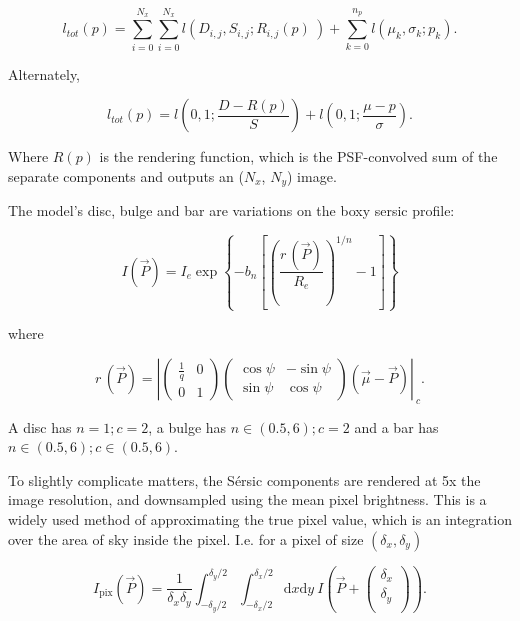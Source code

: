 \documentclass[../main.tex]{subfiles}
\begin{document}
\begin{equation}
l_{tot}(p) = \sum_{i=0}^{N_x}\sum_{i=0}^{N_x}l(D_{i,j}, S_{i,j}; R_{i,j}(p)\ ) + \sum_{k=0}^{n_p}l(\mu_k, \sigma_{k}; p_k).
\end{equation}

Alternately,

\begin{equation}
l_{tot}(p) = l\left(0, 1; \frac{D-R(p)}{S}\right) + l(0, 1; \frac{\mu - p}{\sigma}).
\end{equation}

Where $R(p)$ is the rendering function, which is the PSF-convolved sum of the separate components and outputs an ($N_x$, $N_y$) image.

The model's disc, bulge and bar are variations on the boxy sersic profile:

\begin{equation}
I(\vec{P}) = I_e \exp\left\{-b_n\left[\left(\frac{r\,(\vec{P})}{R_e}\right)^{1/n} - 1\right]\right\}
\end{equation}

where

\begin{equation}
r\,(\vec{P}) = \left|\begin{pmatrix}
\frac{1}{q} & 0 \\
0 & 1
\end{pmatrix}\begin{pmatrix}
\cos\psi & -\sin\psi\\
\sin\psi & \cos\psi
\end{pmatrix}\left(\vec\mu - \vec{P}\right)\right|_{\ c}.
\end{equation}

A disc has $n=1; c=2$, a bulge has $n\in(0.5, 6); c=2$ and a bar has $n\in(0.5, 6); c\in(0.5, 6)$.

To slightly complicate matters, the Sérsic components are rendered at 5x the image resolution, and downsampled using the mean pixel brightness. This is a widely used method of approximating the true pixel value, which is an integration over the area of sky inside the pixel. I.e. for a pixel of size $(\delta_x, \delta_y)$

\begin{equation}
I_\mathrm{pix}(\vec{P}) = \frac{1}{\delta_x \delta_y}\int_{-\delta_y/2}^{\delta_y/2}\int_{-\delta_x/2}^{\delta_x/2}\mathrm{d}x\mathrm{d}y\ I\left(\vec{P} + \begin{pmatrix}
\delta_x \\
\delta_y \\
\end{pmatrix}\right).
\end{equation}
\end{document}
